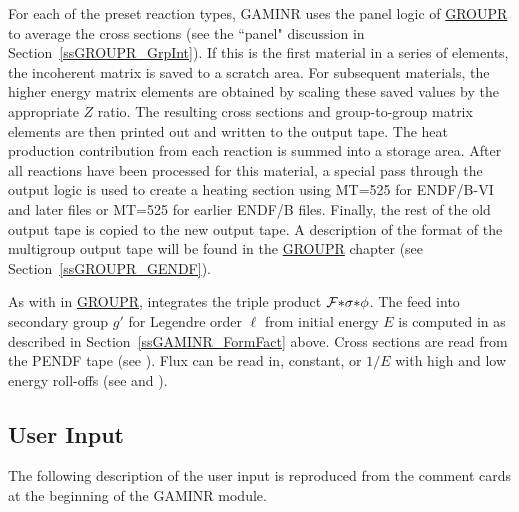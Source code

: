 For each of the preset reaction types, GAMINR uses the panel logic
of \hyperlink{sGROUPRhy}{GROUPR} to
average the cross sections (see the ``panel" discussion
in Section~\ref{ssGROUPR_GrpInt}).  If this is the first material
in a series of elements, the incoherent matrix is saved to a scratch area.
For subsequent materials, the higher energy matrix elements are obtained
by scaling these saved values by the appropriate $Z$ ratio.  The
resulting cross sections and group-to-group matrix elements are then
printed out and written to the output tape.  The heat production
contribution from each reaction is summed into a storage area.  After
all reactions have been processed for this material, a special pass
through the output logic is used to create a heating section using
MT=525 for ENDF/B-VI and later files or MT=525 for earlier
ENDF/B files.  Finally, the rest of the
old output tape is copied to the new output tape.  A description of the
format of the multigroup output tape will be found in the
\hyperlink{sGROUPRhy}{GROUPR} chapter
(see Section~\ref{ssGROUPR_GENDF}).

As with  in
\hyperlink{sGROUPRhy}{GROUPR}, 
integrates the triple product ${\cal F}{*}\sigma{*}\phi$.  The feed into
secondary group $g'$ for Legendre order $\ell$ from initial energy $E$
is computed in  as described in
Section~\ref{ssGAMINR_FormFact} above.  Cross sections are read from
the PENDF tape (see
).  Flux can be read in,
constant, or $1/E$ with high and low energy roll-offs (see
 and
).

\subsection{User Input}
\label{ssGAMINR_UserInp}

The following description of the user input is reproduced from
the comment cards at the beginning of the GAMINR module.

